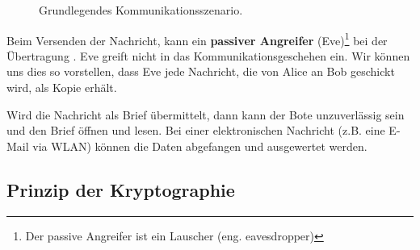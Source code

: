 \begin{figure}[htb]
\caption{Grundlegendes Kommunikationsszenario.}
\label{figure-kommunikationsszenario-2}
\end{figure}

Beim Versenden der Nachricht, kann ein \textbf{passiver Angreifer} (Eve)\footnote{Der passive Angreifer ist  ein Lauscher (eng. eavesdropper)} bei der Übertragung . Eve greift nicht in das Kommunikationsgeschehen ein. Wir können uns dies so vorstellen, dass Eve jede Nachricht, die von Alice an Bob geschickt wird, als Kopie erhält.

\begin{example}
Wird die Nachricht als Brief übermittelt, dann kann der Bote unzuverlässig sein und den Brief öffnen und lesen. Bei einer elektronischen Nachricht (z.B. eine E-Mail via \ac{WLAN}) können die Daten abgefangen und ausgewertet werden.
\end{example}

\subsection{Prinzip der Kryptographie}

